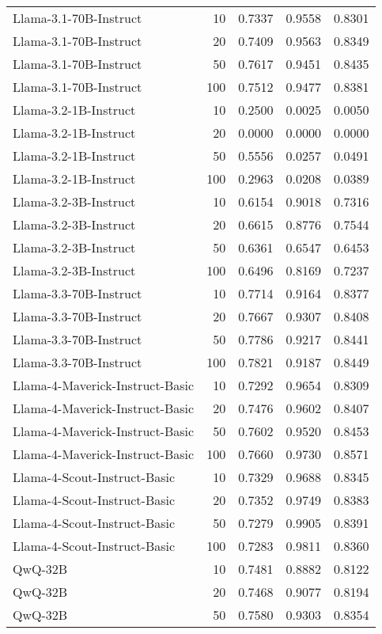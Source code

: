 \begin{tabular}{lrrrr}
Llama-3.1-70B-Instruct & 10 & 0.7337 & 0.9558 & 0.8301 \\
Llama-3.1-70B-Instruct & 20 & 0.7409 & 0.9563 & 0.8349 \\
Llama-3.1-70B-Instruct & 50 & 0.7617 & 0.9451 & 0.8435 \\
Llama-3.1-70B-Instruct & 100 & 0.7512 & 0.9477 & 0.8381 \\
Llama-3.2-1B-Instruct & 10 & 0.2500 & 0.0025 & 0.0050 \\
Llama-3.2-1B-Instruct & 20 & 0.0000 & 0.0000 & 0.0000 \\
Llama-3.2-1B-Instruct & 50 & 0.5556 & 0.0257 & 0.0491 \\
Llama-3.2-1B-Instruct & 100 & 0.2963 & 0.0208 & 0.0389 \\
Llama-3.2-3B-Instruct & 10 & 0.6154 & 0.9018 & 0.7316 \\
Llama-3.2-3B-Instruct & 20 & 0.6615 & 0.8776 & 0.7544 \\
Llama-3.2-3B-Instruct & 50 & 0.6361 & 0.6547 & 0.6453 \\
Llama-3.2-3B-Instruct & 100 & 0.6496 & 0.8169 & 0.7237 \\
Llama-3.3-70B-Instruct & 10 & 0.7714 & 0.9164 & 0.8377 \\
Llama-3.3-70B-Instruct & 20 & 0.7667 & 0.9307 & 0.8408 \\
Llama-3.3-70B-Instruct & 50 & 0.7786 & 0.9217 & 0.8441 \\
Llama-3.3-70B-Instruct & 100 & 0.7821 & 0.9187 & 0.8449 \\
Llama-4-Maverick-Instruct-Basic & 10 & 0.7292 & 0.9654 & 0.8309 \\
Llama-4-Maverick-Instruct-Basic & 20 & 0.7476 & 0.9602 & 0.8407 \\
Llama-4-Maverick-Instruct-Basic & 50 & 0.7602 & 0.9520 & 0.8453 \\
Llama-4-Maverick-Instruct-Basic & 100 & 0.7660 & 0.9730 & 0.8571 \\
Llama-4-Scout-Instruct-Basic & 10 & 0.7329 & 0.9688 & 0.8345 \\
Llama-4-Scout-Instruct-Basic & 20 & 0.7352 & 0.9749 & 0.8383 \\
Llama-4-Scout-Instruct-Basic & 50 & 0.7279 & 0.9905 & 0.8391 \\
Llama-4-Scout-Instruct-Basic & 100 & 0.7283 & 0.9811 & 0.8360 \\
QwQ-32B & 10 & 0.7481 & 0.8882 & 0.8122 \\
QwQ-32B & 20 & 0.7468 & 0.9077 & 0.8194 \\
QwQ-32B & 50 & 0.7580 & 0.9303 & 0.8354 \\

\end{tabular}
